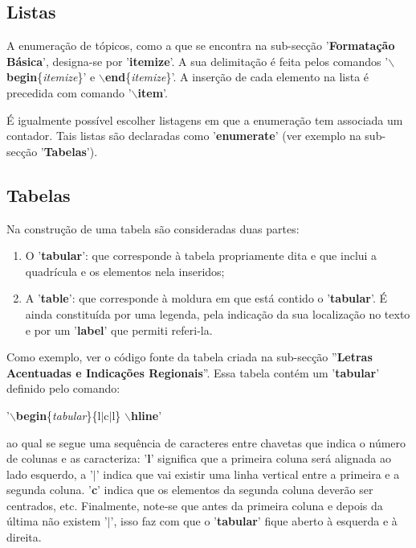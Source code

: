\documentclass[a4paper,12pt]{article}
\begin{document}
\subsection{Listas}

A enumeração de tópicos, como a que se encontra na sub-secção 
'{\bf Formatação Básica}', designa-se por '{\bf itemize}'.
A sua delimitação é feita pelos comandos '$\backslash${\bf begin}\{{\it itemize}\}' e
$\backslash${\bf end}\{{\it itemize}\}'. A inserção de cada elemento na
lista é precedida com comando '$\backslash${\bf item}'.

É igualmente possível escolher listagens em que a enumeração
tem associada um contador. Tais listas são declaradas como
'{\bf enumerate}' (ver exemplo na sub-secção '{\bf Tabelas}').

\subsection{Tabelas}

Na construção de uma tabela são consideradas duas partes:
\begin{enumerate}
\item O '{\bf tabular}': que corresponde à tabela propriamente
dita e que inclui a quadrícula e os elementos nela inseridos;
\item A '{\bf table}': que corresponde à moldura em que está
contido o '{\bf tabular}'. É ainda constituída
por uma legenda, pela indicação da sua localização no texto 
e por um '{\bf label}' que permiti referi-la.
\end{enumerate}

Como exemplo, ver o código fonte da tabela
criada na sub-secção ''{\bf Letras Acentuadas e Indicações Regionais}''.
Essa tabela contém um '{\bf tabular}' definido pelo comando:
\vskip 1.5mm\par
'$\backslash${\bf begin}\{{\it tabular}\}\{l$|$c$|$l\} $\backslash${\bf hline}'
\vskip 1.5mm\par\noindent
ao qual se segue uma sequência de caracteres entre chavetas que indica o
número de colunas e as caracteriza: '{\bf l}'
significa que a primeira coluna será alignada ao lado esquerdo,
a '$|$' indica que vai existir uma linha vertical entre a primeira e a 
segunda coluna. '{\bf c}' indica que os elementos da segunda 
coluna deverão ser centrados, etc. Finalmente, note-se que
antes da primeira coluna e depois da última não existem '$|$',
isso faz com que o '{\bf tabular}' fique aberto à esquerda e
à direita.
\end{document}
